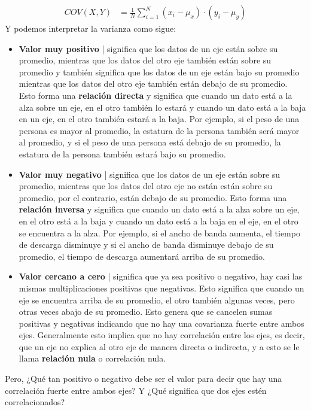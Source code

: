 \documentclass{article}
\begin{document}
\begin{equation}
    \begin{aligned}
        COV(X, Y) &= \frac{1}{N} \sum_{i=1}^{N} (x_i - \mu_x) \cdot (y_i - \mu_y)
    \end{aligned}
\end{equation}
Y podemos interpretar la varianza como sigue:
\begin{itemize}
    \item \textbf{Valor muy positivo} | significa que los datos de un eje están sobre su promedio, mientras que los datos del otro eje también están sobre su promedio y también significa que los datos de un eje están bajo su promedio mientras que los datos del otro eje también están debajo de su promedio. Esto forma una \textbf{relación directa} y significa que cuando un dato está a la alza sobre un eje, en el otro también lo estará y cuando un dato está a la baja en un eje, en el otro también estará a la baja. Por ejemplo, si el peso de una persona es mayor al promedio, la estatura de la persona también será mayor al promedio, y si el peso de una persona está debajo de su promedio, la estatura de la persona también estará bajo su promedio.
    \item \textbf{Valor muy negativo} | significa que los datos de un eje están sobre su promedio, mientras que los datos del otro eje no están están sobre su promedio, por el contrario, están debajo de su promedio. Esto forma una \textbf{relación inversa} y significa que cuando un dato está a la alza sobre un eje, en el otro está a la baja y cuando un dato está a la baja en el eje, en el otro se encuentra a la alza. Por ejemplo, si el ancho de banda aumenta, el tiempo de descarga disminuye y si el ancho de banda disminuye debajo de su promedio, el tiempo de descarga aumentará arriba de su promedio.
    \item \textbf{Valor cercano a cero} | significa que ya sea positivo o negativo, hay casi las mismas multiplicaciones positivas que negativas. Esto significa que cuando un eje se encuentra arriba de su promedio, el otro también algunas veces, pero otras veces abajo de su promedio. Esto genera que se cancelen sumas positivas y negativas indicando que no hay una covarianza fuerte entre ambos ejes. Generalmente esto implica que no hay correlación entre los ejes, es decir, que un eje no explica al otro eje de manera directa o indirecta, y a esto se le llama \textbf{relación nula} o correlación nula.
\end{itemize}
Pero, ¿Qué tan positivo o negativo debe ser el valor para decir que hay una correlación fuerte entre ambos ejes? Y ¿Qué significa que dos ejes estén correlacionados?
\end{document}
